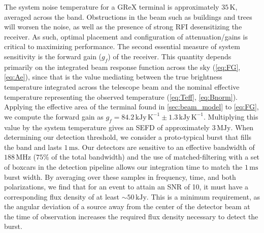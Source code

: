 The system noise temperature for a GReX terminal is approximately $35\,\text{K}$, averaged across the band.
Obstructions in the beam such as buildings and trees will worsen the noise, as well as the presence of strong RFI desensitizing the receiver.
As such, optimal placement and configuration of attenuation/gains is critical to maximizing performance.
The second essential measure of system sensitivity is the forward gain ($g_f$) of the receiver. 
This quantity depends primarily on the integrated beam response function across the sky (\autoref{eq:FG}, \autoref{eq:Ae}), since that is the value mediating between the true brightness temperature integrated across the telescope beam and the nominal effective temperature representing the observed temperature (\autoref{eq:Teff}, \autoref{eq:Bnorm}).
Applying the effective area of the terminal found in \autoref{sec:beam_model} to \autoref{eq:FG}, we compute the forward gain as $g_f=84.2\,\text{kJy}\,\text{K}^{-1}\pm1.3\,\text{kJy}\,\text{K}^{-1}$.
Multiplying this value by the system temperature gives an SEFD of approximately $3\,\text{MJy}$.
When determining our detection threshold, we consider a proto-typical burst that fills the band and lasts $1\,\text{ms}$.
Our detectors are sensitive to an effective bandwidth of $188\,\text{MHz}$ ($75\%$ of the total bandwidth) and the use of matched-filtering with a set of boxcars in the detection pipeline allows our integration time to match the $1\,\text{ms}$ burst width. 
By averaging over these samples in frequency, time, and both polarizations, we find that for an event to attain an SNR of 10, it must have a corresponding flux density of at least $\sim50\,\text{kJy}$. 
This is a minimum requirement, as the angular deviation of a source away from the center of the detector beam at the time of observation increases the required flux density necessary to detect the burst.
